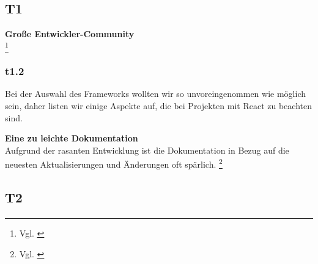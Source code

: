 \paragraph{}

\subsection{T1}


\textbf{Große Entwickler-Community}\\
\footnote{ Vgl. \cite{SO01}}
\newpage

\subsubsection{t1.2}
Bei der Auswahl des Frameworks wollten wir so unvoreingenommen wie möglich sein, daher listen wir einige Aspekte auf, die bei Projekten mit React zu beachten sind.
\newline

\textbf{Eine zu leichte Dokumentation}\\
Aufgrund der rasanten Entwicklung ist die Dokumentation in Bezug auf die neuesten Aktualisierungen und Änderungen oft spärlich. 
\footnote{ Vgl. \cite{R01}}

\subsection{T2}
\paragraph{}

